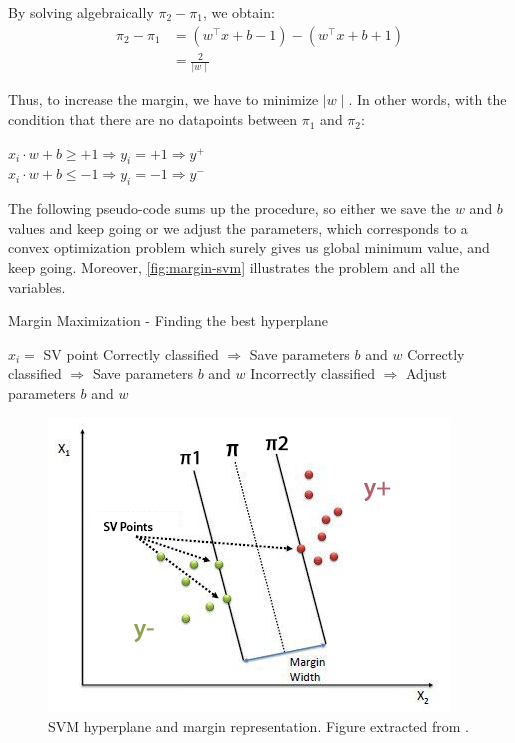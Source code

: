 \documentclass[11pt, openany]{report}
\theoremstyle{plain}
\theoremstyle{definition}
\theoremstyle{remark}
\begin{document}
By solving algebraically $\pi_{2}-\pi_{1}$, we obtain:
\begin{align}
\pi_{2}-\pi_{1} &= (w^\top x + b - 1) - (w^\top x + b + 1)\nonumber  \\ 
 				&= \frac{2}{\mid w \mid} \nonumber
\end{align} 

Thus, to increase the margin, we have to minimize $\mid w \mid$. In other words, with the condition that there are no datapoints between $\pi_{1}$ and $\pi_{2}$:
\begin{center}
$ x_{i} \cdot w + b \geq +1 \Rightarrow y_{i} = +1 \Rightarrow y^{+} $ \\
$ x_{i} \cdot w + b \leq -1 \Rightarrow y_{i} = -1 \Rightarrow y^{-} $
\end{center}

The following pseudo-code sums up the procedure, so either we save the $w$ and $b$ values and keep going or we adjust the parameters, which corresponds to a convex optimization problem which surely gives us global minimum value, and keep going. Moreover, \autoref{fig:margin-svm} illustrates the problem and all the variables. 
 
\begin{algorithm} 
  \caption{Margin Maximization - Finding the best hyperplane} \label{alg:max-margin}
  \begin{algorithmic}[1]
  \State $x_{i} =$ SV point
  \State Correctly classified $\Rightarrow$ Save parameters $b$ and $w$ 
  \State Correctly classified $\Rightarrow$ Save parameters $b$ and $w$
  \Else 
  \State Incorrectly classified $\Rightarrow$ Adjust parameters $b$ and $w$
  \EndIf 
  \EndFor
  \end{algorithmic}
\end{algorithm}




\begin{figure}[h]
  \centering
  \includegraphics[scale=0.85]{figures/margin-svm.png}
  \caption{SVM hyperplane and margin representation. Figure extracted from \cite{svm-towardsdatascience}.}
  \label{fig:margin-svm}
\end{figure}
\end{document}
